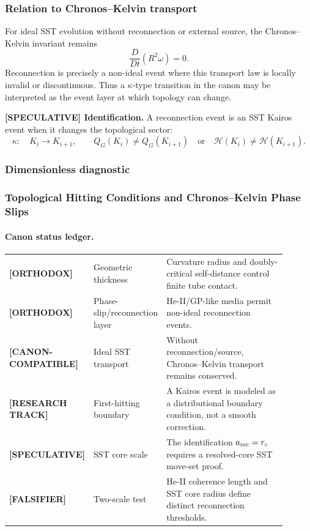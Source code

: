 \subsubsection{Relation to Chronos--Kelvin transport}
For ideal SST evolution without reconnection or external source, the Chronos--Kelvin invariant remains
\begin{equation}
    \frac{D}{Dt}\left(R^2\omega\right)=0.
\end{equation}
Reconnection is precisely a non-ideal event where this transport law is locally invalid or discontinuous. Thus a $\kappa$-type transition in the canon may be interpreted as the event layer at which topology can change.

\textbf{[SPECULATIVE] Identification.}
A reconnection event is an SST Kairos event when it changes the topological sector:
\begin{equation}
    \kappa:\quad K_i\rightarrow K_{i+1},
    \qquad
    Q_G(K_i)\neq Q_G(K_{i+1})
    \quad\text{or}\quad
    \mathcal H(K_i)\neq \mathcal H(K_{i+1}).
\end{equation}

\subsubsection{Dimensionless diagnostic}\subsubsection{Topological Hitting Conditions and Chronos--Kelvin Phase Slips}
\label{subsubsec:chronos_kelvin_hitting_conditions}

\paragraph{Canon status ledger.}
\begin{center}
\small
\begin{tabular}{p{0.18\linewidth}p{0.24\linewidth}p{0.48\linewidth}}
\textbf{[ORTHODOX]} & Geometric thickness & Curvature radius and doubly-critical self-distance control finite tube contact.\\
\textbf{[ORTHODOX]} & Phase-slip/reconnection layer & He-II/GP-like media permit non-ideal reconnection events.\\
\textbf{[CANON-COMPATIBLE]} & Ideal SST transport & Without reconnection/source, Chronos--Kelvin transport remains conserved.\\
\textbf{[RESEARCH TRACK]} & First-hitting boundary & A Kairos event is modeled as a distributional boundary condition, not a smooth correction.\\
\textbf{[SPECULATIVE]} & SST core scale & The identification $a_{\rm rec}=r_c$ requires a resolved-core SST move-set proof.\\
\textbf{[FALSIFIER]} & Two-scale test & He-II coherence length and SST core radius define distinct reconnection thresholds.
\end{tabular}
\end{center}

